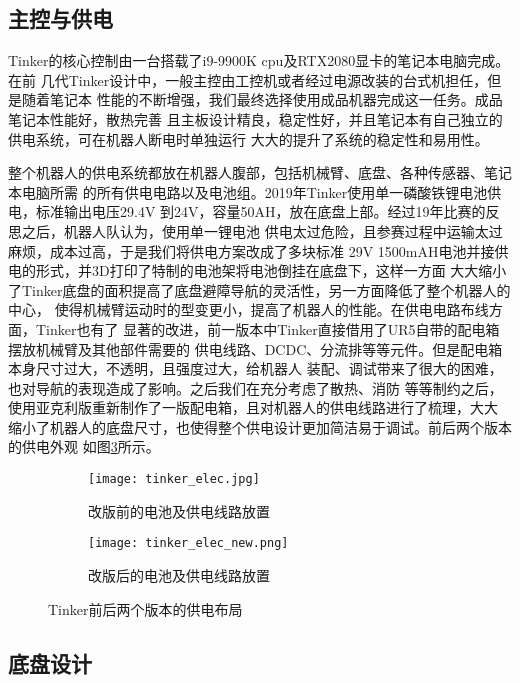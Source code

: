 \subsection{主控与供电}

Tinker的核心控制由一台搭载了i9-9900K cpu及RTX2080显卡的笔记本电脑完成。在前
几代Tinker设计中，一般主控由工控机或者经过电源改装的台式机担任，但是随着笔记本
性能的不断增强，我们最终选择使用成品机器完成这一任务。成品笔记本性能好，散热完善
且主板设计精良，稳定性好，并且笔记本有自己独立的供电系统，可在机器人断电时单独运行
大大的提升了系统的稳定性和易用性。

整个机器人的供电系统都放在机器人腹部，包括机械臂、底盘、各种传感器、笔记本电脑所需
的所有供电电路以及电池组。2019年Tinker使用单一磷酸铁锂电池供电，标准输出电压29.4V
到24V，容量50AH，放在底盘上部。经过19年比赛的反思之后，机器人队认为，使用单一锂电池
供电太过危险，且参赛过程中运输太过麻烦，成本过高，于是我们将供电方案改成了多块标准
29V 1500mAH电池并接供电的形式，并3D打印了特制的电池架将电池倒挂在底盘下，这样一方面
大大缩小了Tinker底盘的面积提高了底盘避障导航的灵活性，另一方面降低了整个机器人的中心，
使得机械臂运动时的型变更小，提高了机器人的性能。在供电电路布线方面，Tinker也有了
显著的改进，前一版本中Tinker直接借用了UR5自带的配电箱摆放机械臂及其他部件需要的
供电线路、DCDC、分流排等等元件。但是配电箱本身尺寸过大，不透明，且强度过大，给机器人
装配、调试带来了很大的困难，也对导航的表现造成了影响。之后我们在充分考虑了散热、消防
等等制约之后，使用亚克利版重新制作了一版配电箱，且对机器人的供电线路进行了梳理，大大
缩小了机器人的底盘尺寸，也使得整个供电设计更加简洁易于调试。前后两个版本的供电外观
如图\ref{fig:elec}所示。

\begin{figure}
\centering
\begin{subfigure}{.5\textwidth}
  \centering
  \texttt{[image: tinker\_elec.jpg]}
  \caption{改版前的电池及供电线路放置}
  \label{fig:old_elec}
\end{subfigure}%
\begin{subfigure}{.5\textwidth}
  \centering
  \texttt{[image: tinker\_elec\_new.png]}
  \caption{改版后的电池及供电线路放置}
  \label{fig:new_elec}
\end{subfigure}
\caption{Tinker前后两个版本的供电布局}
\label{fig:elec}
\end{figure}

\subsection{底盘设计}

